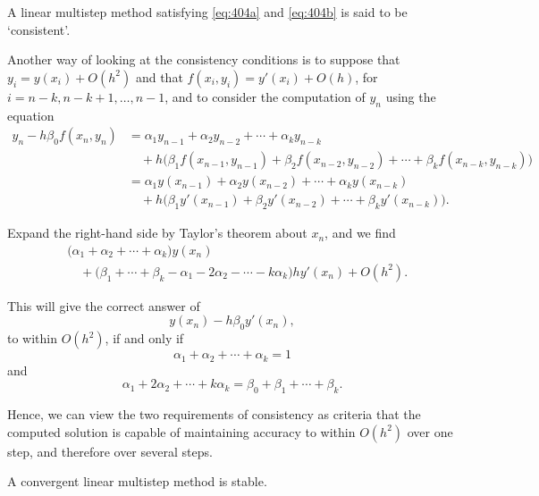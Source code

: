 \begin{definition}

  \label{def:404B}
A linear multistep method satisfying \eqref{eq:404a} and \eqref{eq:404b} is said to be `consistent'.

Another way of looking at the consistency conditions is to suppose that $y_i = y(x_i) + O(h^2)$ and that $f(x_i, y_i) = y'(x_i) + O(h)$, for $i = n-k, n-k+1, \dots, n-1$, and to consider the computation of $y_n$ using the equation
\[
\begin{aligned}
y_n - h\beta_0 f(x_n, y_n)
&= \alpha_1 y_{n-1} + \alpha_2 y_{n-2} + \cdots + \alpha_k y_{n-k} \\
&\quad + h\bigl(\beta_1 f(x_{n-1}, y_{n-1}) + \beta_2 f(x_{n-2}, y_{n-2}) + \cdots + \beta_k f(x_{n-k}, y_{n-k})\bigr) \\
&= \alpha_1 y(x_{n-1}) + \alpha_2 y(x_{n-2}) + \cdots + \alpha_k y(x_{n-k}) \\
&\quad + h\bigl(\beta_1 y'(x_{n-1}) + \beta_2 y'(x_{n-2}) + \cdots + \beta_k y'(x_{n-k})\bigr).
\end{aligned}
\]

Expand the right-hand side by Taylor's theorem about $x_n$, and we find
\[
\begin{aligned}
&\bigl(\alpha_1 + \alpha_2 + \cdots + \alpha_k\bigr) y(x_n) \\
&\quad + \bigl(\beta_1 + \cdots + \beta_k - \alpha_1 - 2\alpha_2 - \cdots - k\alpha_k\bigr) h y'(x_n) + O(h^2).
\end{aligned}
\]

This will give the correct answer of
\[
y(x_n) - h\beta_0 y'(x_n),
\]
to within $O(h^2)$, if and only if
\[
\alpha_1 + \alpha_2 + \cdots + \alpha_k = 1
\]
and
\[
\alpha_1 + 2\alpha_2 + \cdots + k\alpha_k = \beta_0 + \beta_1 + \cdots + \beta_k.
\]

Hence, we can view the two requirements of consistency as criteria that the computed solution is capable of maintaining accuracy to within $O(h^2)$ over one step, and therefore over several steps.
\end{definition}

\begin{theorem}

  \label{thm:405A}
A convergent linear multistep method is stable.
\end{theorem}

